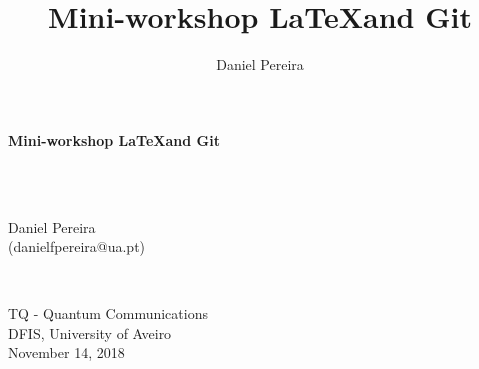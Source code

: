 \documentclass[usenames,dvipsnames,aspectratio=169]{beamer}
\title{Mini-workshop \LaTeX and Git}
\author{Daniel Pereira}
\institute{Departamento de Física - Universidade de Aveiro}
\begin{document}
{
%
\begin{frame}
\color{black} \sffamily \noindent \large
\hspace*{1cm}
\begin{minipage}{10cm}
\vspace*{.4cm}
\begin{flushleft}
 \color{title} \sffamily \noindent \Large
\textbf{Mini-workshop \LaTeX and Git}
\end{flushleft}
\end{minipage}
\vspace*{.8cm}\\
%
~\\
\hspace*{1cm}
\begin{minipage}{3cm}
\color{author}
\large Daniel Pereira\\
(danielfpereira@ua.pt)
\end{minipage}
%
\vspace*{.8cm}\\
\hspace*{1cm}
\begin{minipage}{6cm}
\color{title}
\large TQ - Quantum Communications\\
DFIS, University of Aveiro\\
November 14, 2018
\end{minipage}
\end{frame}
}


\end{document}
